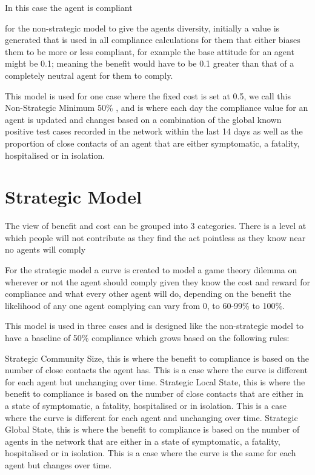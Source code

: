 \documentclass{article}
\begin{document}
In this case the agent is compliant

for the non-strategic model to give the agents diversity, initially a value is generated that is used in all compliance calculations for them that either biases them to be more or less compliant, for example the base attitude for an agent might be 0.1; meaning the benefit would have to be 0.1 greater than that of a completely neutral agent for them to comply.

This model is used for one case where the fixed cost is set at 0.5, we call this Non-Strategic Minimum 50\% , and is where each day the compliance value for an agent is updated and changes based on a combination of the global known positive test cases recorded in the network within the last 14 days as well as the proportion of close contacts of an agent that are either symptomatic, a fatality, hospitalised or in isolation.


\section{Strategic Model}
The view of benefit and cost can be grouped into 3 categories.
There is a level at which people will not contribute as they find the act pointless as they know near no agents will comply 

For the strategic model a curve is created to model a game theory dilemma on wherever or not the agent should comply given they know the cost and reward for compliance and what every other agent will do, depending on the benefit the likelihood of any one agent complying can vary from 0, to 60-99\% to 100\%.

This model is used in three cases and is designed like the non-strategic model to have a baseline of 50\% compliance which grows based on the following rules:\newline

Strategic Community Size, this is where the benefit to compliance is based on the number of close contacts the agent has. This is a case where the curve is different for each agent but unchanging over time.\newline\newline
Strategic Local State, this is where the benefit to compliance is based on the number of close contacts that are either in a state of symptomatic, a fatality, hospitalised or in isolation. This is a case where the curve is different for each agent and unchanging over time.\newline\newline
Strategic Global State, this is where the benefit to compliance is based on the number of agents in the network that are either in a state of symptomatic, a fatality, hospitalised or in isolation. This is a case where the curve is the same for each agent but changes over time.
\end{document}
